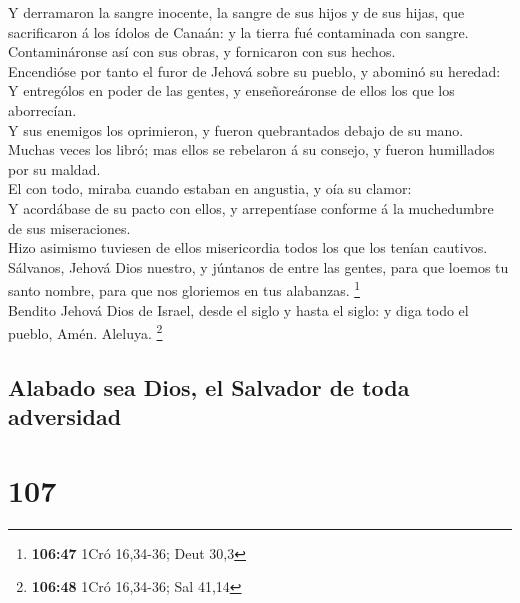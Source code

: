  Y derramaron la sangre inocente, la sangre de sus hijos y
de sus hijas, que sacrificaron á los ídolos de Canaán: y la tierra fué
contaminada con sangre.\\
 Contamináronse así con sus obras, y fornicaron con sus
hechos.\\
 Encendióse por tanto el furor de Jehová sobre su pueblo, y
abominó su heredad:\\
 Y entrególos en poder de las gentes, y enseñoreáronse de
ellos los que los aborrecían.\\
 Y sus enemigos los oprimieron, y fueron quebrantados
debajo de su mano.\\
 Muchas veces los libró; mas ellos se rebelaron á su
consejo, y fueron humillados por su maldad.\\
 El con todo, miraba cuando estaban en angustia, y oía su
clamor:\\
 Y acordábase de su pacto con ellos, y arrepentíase
conforme á la muchedumbre de sus miseraciones.\\
 Hizo asimismo tuviesen de ellos misericordia todos los que
los tenían cautivos.\\
 Sálvanos, Jehová Dios nuestro, y júntanos de entre las
gentes, para que loemos tu santo nombre, para que nos gloriemos en tus
alabanzas. \footnote{\textbf{106:47} 1Cró 16,34-36; Deut 30,3}\\
 Bendito Jehová Dios de Israel, desde el siglo y hasta el
siglo: y diga todo el pueblo, Amén. Aleluya. \footnote{\textbf{106:48}
  1Cró 16,34-36; Sal 41,14}

\hypertarget{alabado-sea-dios-el-salvador-de-toda-adversidad}{%
\subsection{Alabado sea Dios, el Salvador de toda
adversidad}\label{alabado-sea-dios-el-salvador-de-toda-adversidad}}

\hypertarget{section-106}{%
\section{107}\label{section-106}}

